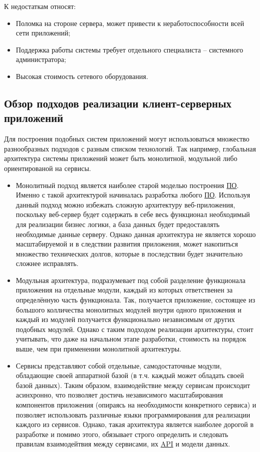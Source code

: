 К недостаткам относят:

\begin{itemize}
    \item Поломка на стороне сервера, может привести к неработоспособности всей сети приложений;
    \item Поддержка работы системы требует отдельного специалиста – системного администратора;
    \item Высокая стоимость сетевого оборудования.
\end{itemize}

\subsection{Обзор подходов реализации клиент-серверных приложений}\label{subsec:1-analisis} \indent

Для построения подобных систем приложений могут использоваться множество разнообразных подходов с разным списком технологий.
Так например, глобальная архитектура системы приложений может быть монолитной, модульной либо ориентированой на сервисы.

\begin{itemize}
    \item Монолитный подход является наиболее старой моделью построения \hyperlink{gloss:software}{ПО}. 
    Именно с такой архитектурой начиналась разработка любого \hyperlink{gloss:software}{ПО}. 
    Используя данный подход можно избежать сложную архитектуру веб-приложения, 
    поскольку веб-сервер будет содержать в себе весь функционал необходимый для реализации бизнес логики, а база данных будет предоставлять необходимые данные серверу. 
    Однако данная архитектура не является хорошо масштабируемой и в следствии развития приложения, 
    может накопиться множество технических долгов, которые в последствии будет значительно сложнее исправлять.
    \item Модульная архитектура, подразумевает под собой разделение функционала приложения на отдельные модули, 
    каждый из которых ответственен за определённую часть функционала.
    Так, получается приложение, состоящее из большого колличества монолитных модулей внутри одного приложения и каждый из модулей получается функционально независимым от других подобных модулей.
    Однако с таким подходом реализации архитектуры, стоит учитывать, что даже на начальном этапе разработки, стоимость на порядок выше, чем при применении монолитной архитектуры.
    \item Сервисы представляют собой отдельные, самодостаточные модули, обладающие своей аппаратной базой (в т.ч. каждый может обладать своей базой данных).
    Таким образом, взаимодействие между сервисам происходит асинхронно, 
    что позволяет достичь независимого масштабирования компонентов приложения (опираясь на необходимости конкретного сервиса) 
    и позволяет использовать различные языки программирования для реализации каждого из сервисов.
    Однако, такая архитектура является наиболее дорогой в разработке и помимо этого, 
    обязывает строго определить и следовать правилам взаимодейтвия между сервисами, их \hyperlink{gloss:api}{API} и модели данных.
\end{itemize}


